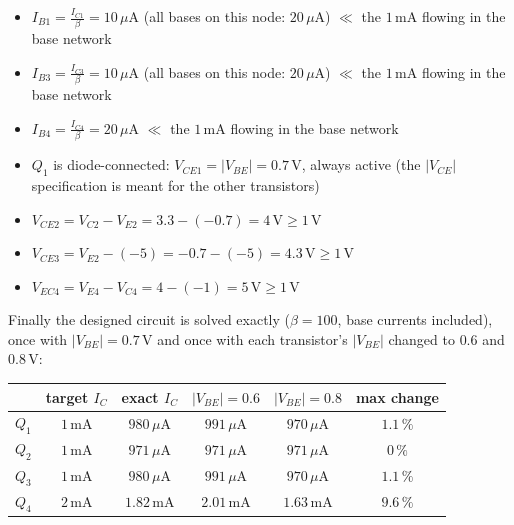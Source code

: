 \documentclass[11pt]{article}
\newcommand{\solstep}[2]{\par\medskip{\color{stepc}\textbf{Step #1 --- #2}}\par\nopagebreak}
\begin{document}
\solstep{4}{Check the design}\begin{itemize}[leftmargin=*,itemsep=2pt]
\item $I_{B1} = \frac{I_{C1}}{\beta} = 10\,\mu \mathrm{A}$ (all bases on this node: $20\,\mu \mathrm{A}$) $\ll$ the $1\,\mathrm{m}\mathrm{A}$ flowing in the base network \checkmark
\item $I_{B3} = \frac{I_{C3}}{\beta} = 10\,\mu \mathrm{A}$ (all bases on this node: $20\,\mu \mathrm{A}$) $\ll$ the $1\,\mathrm{m}\mathrm{A}$ flowing in the base network \checkmark
\item $I_{B4} = \frac{I_{C4}}{\beta} = 20\,\mu \mathrm{A}$ $\ll$ the $1\,\mathrm{m}\mathrm{A}$ flowing in the base network \checkmark
\item $Q_{1}$ is diode-connected: $V_{CE1} = |V_{BE}| = 0.7$\,V, always active (the $|V_{CE}|$ specification is meant for the other transistors) \checkmark
\item $V_{CE2} = V_{C2} - V_{E2} = 3.3 - (-0.7) = 4\,\mathrm{V} \ge 1$\,V \checkmark
\item $V_{CE3} = V_{E2} - (-5) = -0.7 - (-5) = 4.3\,\mathrm{V} \ge 1$\,V \checkmark
\item $V_{EC4} = V_{E4} - V_{C4} = 4 - (-1) = 5\,\mathrm{V} \ge 1$\,V \checkmark
\end{itemize}
Finally the designed circuit is solved exactly ($\beta=100$, base currents included), once with $|V_{BE}|=0.7$\,V and once with each transistor's $|V_{BE}|$ changed to $0.6$ and $0.8$\,V:\begin{center}\renewcommand{\arraystretch}{1.35}
\begin{tabular}{cccccc}
\toprule
 & target $I_C$ & exact $I_C$ & $|V_{BE}|=0.6$ & $|V_{BE}|=0.8$ & max change \\
\midrule
$Q_{1}$ & $1\,\mathrm{m}\mathrm{A}$ & $980\,\mu \mathrm{A}$ & $991\,\mu \mathrm{A}$ & $970\,\mu \mathrm{A}$ & $1.1\,\%$ \\
$Q_{2}$ & $1\,\mathrm{m}\mathrm{A}$ & $971\,\mu \mathrm{A}$ & $971\,\mu \mathrm{A}$ & $971\,\mu \mathrm{A}$ & $0\,\%$ \\
$Q_{3}$ & $1\,\mathrm{m}\mathrm{A}$ & $980\,\mu \mathrm{A}$ & $991\,\mu \mathrm{A}$ & $970\,\mu \mathrm{A}$ & $1.1\,\%$ \\
$Q_{4}$ & $2\,\mathrm{m}\mathrm{A}$ & $1.82\,\mathrm{m}\mathrm{A}$ & $2.01\,\mathrm{m}\mathrm{A}$ & $1.63\,\mathrm{m}\mathrm{A}$ & $9.6\,\%$ \\
\bottomrule
\end{tabular}\end{center}
\end{document}

